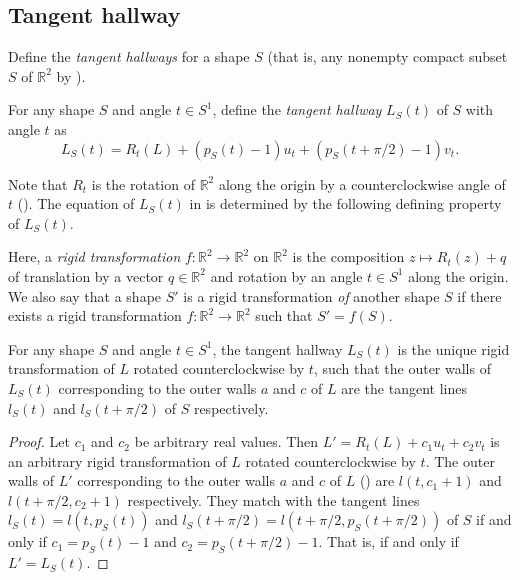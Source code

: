 \subsection{Tangent hallway}

Define the \emph{tangent hallways} for a shape \(S\) (that is, any nonempty compact subset \(S\) of \(\mathbb{R}^2\) by ).

\begin{definition}

For any shape \(S\) and angle \(t \in S^1\), define the \emph{tangent hallway} \(L_S(t)\) of \(S\) with angle \(t\) as
\[
L_S(t) = R_t(L) + (p_S(t) - 1)  u_t + (p_S(t + \pi/2) - 1) v_t.
\]

\label{def:tangent-hallway}
\end{definition}

Note that \(R_t\) is the rotation of \(\mathbb{R}^2\) along the origin by a counterclockwise angle of \(t\) (). The equation of \(L_S(t)\) in  is determined by the following defining property of \(L_S(t)\).

\begin{definition}

Here, a \emph{rigid transformation} \(f : \mathbb{R}^2 \to \mathbb{R}^2\) on \(\mathbb{R}^2\) is the composition \(z \mapsto R_t(z) + q\) of translation by a vector \(q \in \mathbb{R}^2\) and rotation by an angle \(t \in S^1\) along the origin. We also say that a shape \(S'\) is a rigid transformation \emph{of} another shape \(S\) if there exists a rigid transformation \(f : \mathbb{R}^2 \to \mathbb{R}^2\) such that \(S' = f(S)\).

\label{def:rigid-transformation}
\end{definition}

\begin{proposition}

For any shape \(S\) and angle \(t \in S^1\), the tangent hallway \(L_S(t)\) is the unique rigid transformation of \(L\) rotated counterclockwise by \(t\), such that the outer walls of \(L_S(t)\) corresponding to the outer walls \(a\) and \(c\) of \(L\) are the tangent lines \(l_S(t)\) and \(l_S(t + \pi/2)\) of \(S\) respectively.

\label{pro:tangent-hallway}
\end{proposition}

\begin{proof}
Let \(c_1\) and \(c_2\) be arbitrary real values. Then \(L' = R_t(L) + c_1 u_t + c_2 v_t\) is an arbitrary rigid transformation of \(L\) rotated counterclockwise by \(t\). The outer walls of \(L'\) corresponding to the outer walls \(a\) and \(c\) of \(L\) () are \(l(t, c_1 + 1)\) and \(l(t + \pi/2, c_2 + 1)\) respectively. They match with the tangent lines \(l_S(t) = l(t, p_S(t))\) and \(l_S(t + \pi/2) = l(t + \pi/2, p_S(t + \pi/2))\) of \(S\) if and only if \(c_1 = p_S(t) - 1\) and \(c_2 = p_S(t + \pi/2) - 1\). That is, if and only if \(L' = L_S(t)\).
\end{proof}

